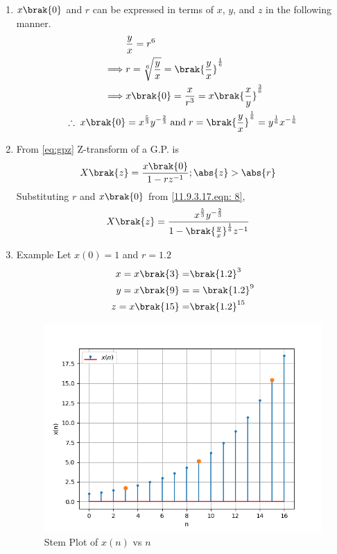 \documentclass[journal,12pt,twocolumn]{IEEEtran}
\theoremstyle{remark}
\begin{document}
\begin{enumerate}
\item
$x\brak{0}$ and $r$ can be expressed in terms of $x$, $y$, and $z$ in the following manner.
\begin{align}
    &\frac{y}{x}=r^6 \\
	\implies& r=\sqrt[6]{\frac{y}{x}}=\brak{\frac{y}{x}}^{\frac{1}{6}}\\
    \implies& x\brak{0}=\frac{x}{r^3} =x\brak{\frac{x}{y}}^{\frac{3}{6}}\\
	\therefore\; x\brak{0}&=x^{\frac{5}{3}}y^{-\frac{2}{3}}\;
	\text{and}\; r=\brak{\frac{y}{x}}^{\frac{1}{6}}= y^{\frac{1}{6}}x^{-\frac{1}{6}} \label{11.9.3.17.eqn: 8}
\end{align}
\item 
From \eqref{eq:gpz} Z-transform of a G.P. is
\begin{align}
    X\brak{z}&=\frac{x\brak{0}}{1-rz^{-1}}; \abs{z}>\abs{r}
\end{align}
Substituting $r$ and $x\brak{0}$ from \eqref{11.9.3.17.eqn: 8}, 
\begin{align}
     X\brak{z}&=\frac{x^{\frac{5}{3}}y^{-\frac{2}{3}}}{1-{\brak{\frac{y}{x}}^{\frac{1}{6}}}z^{-1}}
\end{align}
\item Example 
Let $x(0)=1$ and $r=1.2$
\begin{align}
    x=x\brak{3}=& \brak{1.2}^3 \\
    y=x\brak{9}=&=\brak{1.2}^9\\
    z=x\brak{15}=&\brak{1.2}^{15}
\end{align}
\begin{figure}[h]
    \centering
    \includegraphics[width=\columnwidth]{ncert-maths/11/9/3/17/figs/A_1.png}
	\caption{Stem Plot of $x(n)$ vs $n$}
        \label{11.9.3.17.fig:1}
\end{figure}
\end{enumerate}
\end{document}
